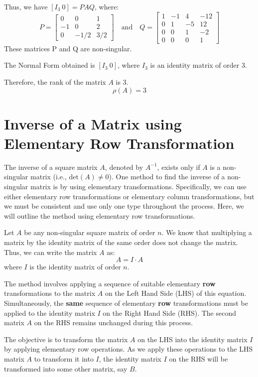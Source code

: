 \documentclass{article}
\begin{document}
Thus, we have $[I_3 \ 0] = PAQ$, where:
\[ P = \begin{bmatrix} 0 & 0 & 1 \\ -1 & 0 & 2 \\ 0 & -1/2 & 3/2 \end{bmatrix} \quad \text{and} \quad Q = \begin{bmatrix} 1 & -1 & 4 & -12 \\ 0 & 1 & -5 & 12 \\ 0 & 0 & 1 & -2 \\ 0 & 0 & 0 & 1 \end{bmatrix} \]
These matrices P and Q are non-singular.

The Normal Form obtained is $[I_3 \ 0]$, where $I_3$ is an identity matrix of order 3.

Therefore, the rank of the matrix $A$ is 3.
\[ \rho(A) = 3 \]

\section{Inverse of a Matrix using Elementary Row Transformation}

The inverse of a square matrix $A$, denoted by $A^{-1}$, exists only if $A$ is a non-singular matrix (i.e., $\text{det}(A) \neq 0$). One method to find the inverse of a non-singular matrix is by using elementary transformations. Specifically, we can use either elementary row transformations or elementary column transformations, but we must be consistent and use only one type throughout the process. Here, we will outline the method using elementary row transformations.

Let $A$ be any non-singular square matrix of order $n$. We know that multiplying a matrix by the identity matrix of the same order does not change the matrix. Thus, we can write the matrix $A$ as:
\[ A = I \cdot A \]
where $I$ is the identity matrix of order $n$.

The method involves applying a sequence of suitable elementary \textbf{row} transformations to the matrix $A$ on the Left Hand Side (LHS) of this equation. Simultaneously, the \textbf{same} sequence of elementary \textbf{row} transformations must be applied to the identity matrix $I$ on the Right Hand Side (RHS). The second matrix $A$ on the RHS remains unchanged during this process.

The objective is to transform the matrix $A$ on the LHS into the identity matrix $I$ by applying elementary row operations. As we apply these operations to the LHS matrix $A$ to transform it into $I$, the identity matrix $I$ on the RHS will be transformed into some other matrix, say $B$.
\end{document}
